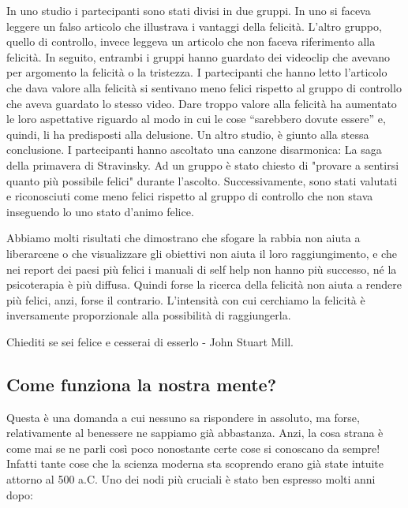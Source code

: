 \documentclass[12pt]{book} %
\begin{document}
In uno studio i partecipanti sono stati divisi in
due gruppi. In uno si faceva leggere un falso articolo che illustrava i vantaggi della felicità.
L'altro gruppo, quello di controllo, invece leggeva un articolo che non faceva riferimento alla
felicità. In seguito, entrambi i gruppi hanno guardato dei videoclip che avevano per argomento la felicità o la
tristezza. I partecipanti che hanno letto l'articolo che dava valore alla felicità si sentivano
meno felici rispetto al gruppo di controllo che aveva guardato lo stesso video. Dare troppo valore alla felicità ha
aumentato le loro aspettative riguardo al modo in cui le cose “sarebbero dovute essere” e, quindi, li ha predisposti
alla delusione. Un altro
studio, è giunto alla stessa conclusione. I partecipanti hanno ascoltato una canzone disarmonica: La saga della primavera di
Stravinsky. Ad un gruppo è stato chiesto di "provare a sentirsi quanto più possibile
felici" durante l'ascolto. Successivamente, sono stati valutati e
riconosciuti come meno felici rispetto al gruppo di controllo che non stava inseguendo lo uno stato
d'animo felice. 

Abbiamo molti risultati che dimostrano che sfogare la rabbia non aiuta a liberarcene o che visualizzare gli obiettivi
non aiuta il loro raggiungimento, e che nei report dei paesi più felici i manuali di self help non hanno più successo,
né la psicoterapia è più diffusa. Quindi forse la ricerca della felicità non aiuta a rendere più felici, anzi, forse il
contrario. L'intensità con cui cerchiamo la felicità è inversamente proporzionale alla possibilità
di raggiungerla. 


\bigskip

Chiediti se sei felice e cesserai di esserlo - John Stuart Mill.

\subsection{Come funziona la nostra mente?}
Questa è una domanda a cui nessuno sa rispondere in assoluto, ma forse, relativamente al benessere ne sappiamo già
abbastanza. Anzi, la cosa strana è come mai se ne parli così poco nonostante certe cose si conoscano da sempre! Infatti
tante cose che la scienza moderna sta scoprendo erano già state intuite attorno al 500 a.C. Uno dei nodi più cruciali è
stato ben espresso molti anni dopo:
\end{document}
